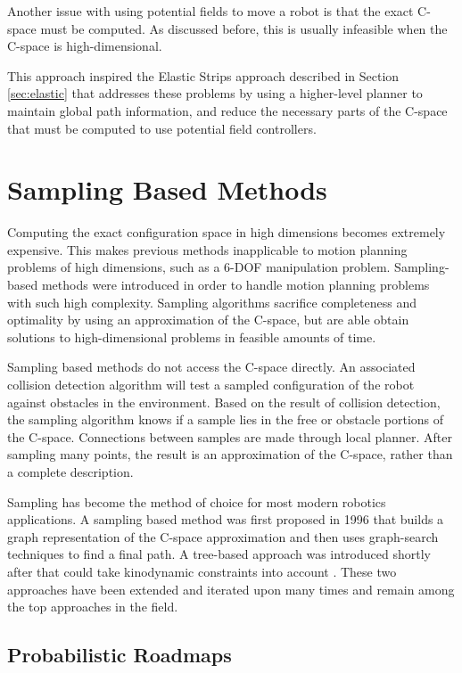 \documentclass[10pt,conference]{ieeeconf}
\begin{document}
Another issue with using potential fields to move a robot is that the exact C-space must be computed. As discussed before, this is usually infeasible when the C-space is high-dimensional.

This approach inspired the Elastic Strips approach described in Section \ref{sec:elastic} that addresses these problems by using a higher-level planner to maintain global path information, and reduce the necessary parts of the C-space that must be computed to use potential field controllers.

	
\section{Sampling Based Methods} \label{sec:sampling}

Computing the exact configuration space in high dimensions becomes extremely expensive. This makes previous methods inapplicable to motion planning problems of high dimensions, such as a 6-DOF manipulation problem. Sampling-based methods were introduced in order to handle motion planning problems with such high complexity. Sampling algorithms sacrifice completeness and optimality by using an approximation of the C-space, but are able obtain solutions to high-dimensional problems in feasible amounts of time.

Sampling based methods do not access the C-space directly. An associated collision detection algorithm will test a sampled configuration of the robot against obstacles in the environment. Based on the result of collision detection, the sampling algorithm knows if a sample lies in the free or obstacle portions of the C-space. Connections between samples are made through local planner. After sampling many points, the result is an approximation of the C-space, rather than a complete description. 

Sampling has become the method of choice for most modern robotics applications. A sampling based method was first proposed in 1996 \cite{PRM} that builds a graph representation of the C-space approximation and then uses graph-search techniques to find a final path. A tree-based approach was introduced shortly after that could take kinodynamic constraints into account \cite{RRT}. These two approaches have been extended and iterated upon many times and remain among the top approaches in the field.

\subsection{Probabilistic Roadmaps}
\end{document}
